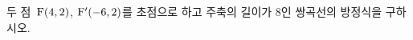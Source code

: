 두 점~$\mathrm{F}(4{,}\mkern3mu\mathopen{}2)$, $\mathrm{F}'(-6{,}\mkern3mu\mathopen{}2)$를 초점으로 하고 주축의 길이가 $8$인 쌍곡선의 방정식을 구하시오.
